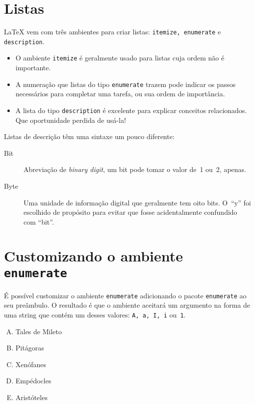 \documentclass[a4paper,oneside]{article}
\begin{document}
\frenchspacing

\section{Listas}

\LaTeX{} vem com três ambientes para criar listas: \texttt{itemize, enumerate}
e \texttt{description}.

\begin{itemize}
  \item O ambiente \texttt{itemize} é geralmente usado para listas cuja ordem
    não é importante.
  \item A numeração que listas do tipo \texttt{enumerate} trazem pode indicar
    os passos necessários para completar uma tarefa, ou sua ordem de
    importância.
  \item A lista do tipo \texttt{description} é excelente para explicar
    conceitos relacionados. Que oportunidade perdida de usá-la!
\end{itemize}

Listas de descrição têm uma sintaxe um pouco diferente:

\begin{description}
  \item[Bit] Abreviação de \emph{binary digit}, um bit pode tomar o valor de~1
    ou~2, apenas.
  \item[Byte] Uma unidade de informação digital que geralmente tem oito bits.
    O~“y” foi escolhido de propósito para evitar que fosse acidentalmente
    confundido com “bit”.
\end{description}

\section{Customizando o ambiente \texttt{enumerate}}

É possível customizar o ambiente \texttt{enumerate} adicionando o pacote
\texttt{enumerate} ao seu preâmbulo. O resultado é que o ambiente aceitará um
argumento na forma de uma string que contém um desses valores: \texttt{A,
a, I, i} ou~\texttt{1}.

\begin{enumerate}[A)]
  \item Tales de Mileto
  \item Pitágoras
  \item Xenófanes
  \item Empédocles
  \item Aristóteles
\end{enumerate}
\end{document}
